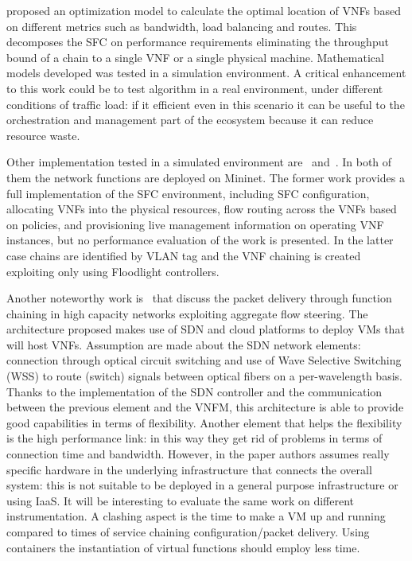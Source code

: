 \cite{GhaznaviSAB16} proposed an optimization model to calculate the optimal
location of VNFs based on different metrics such as bandwidth, load balancing
and routes. This decomposes the SFC on performance requirements eliminating the
throughput bound of a chain to a single VNF or a single physical machine.
Mathematical models developed was tested in a simulation environment. A critical
enhancement to this work could be to test algorithm in a real environment, under
different conditions of traffic load: if it efficient even in this scenario it
can be useful to the orchestration and management part of the ecosystem because
it can reduce resource waste.

Other implementation tested in a simulated environment
are~\cite{csoma2014escape} and~\cite{kim2016evaluations}. In both of them the
network functions are deployed on Mininet. The former work provides a full
implementation of the SFC environment, including SFC configuration, allocating
VNFs into the physical resources, flow routing across the VNFs based on
policies, and provisioning live management information on operating VNF
instances, but no performance evaluation of the work is presented. In the latter
case chains are identified by VLAN tag and the VNF chaining is created
exploiting only using Floodlight controllers.

Another noteworthy work is~\cite{xia2015optical} that discuss the packet
delivery through function chaining in high capacity networks exploiting
aggregate flow steering. The architecture proposed makes use of SDN and cloud
platforms to deploy VMs that will host VNFs. Assumption are made about the SDN
network elements: connection through optical circuit switching and use of Wave
Selective Switching (WSS) to route (switch) signals between optical fibers on a
per-wavelength basis. Thanks to the implementation of the SDN controller and the
communication between the previous element and the VNFM, this architecture is
able to provide good capabilities in terms of flexibility. Another element that
helps the flexibility is the high performance link: in this way they get rid of
problems in terms of connection time and bandwidth. However, in the paper
authors assumes really specific hardware in the underlying infrastructure that
connects the overall system: this is not suitable to be deployed in a general
purpose infrastructure or using IaaS. It will be interesting to evaluate the
same work on different instrumentation. A clashing aspect is the time to make a
VM up and running compared to times of service chaining configuration/packet
delivery. Using containers the instantiation of virtual functions should employ
less time.

